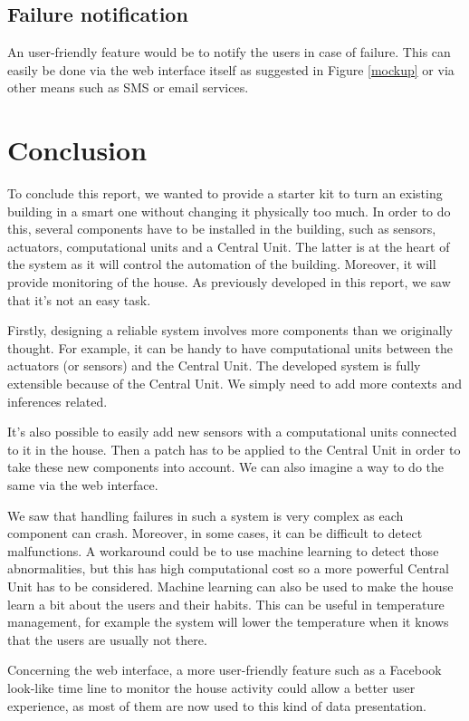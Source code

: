 \documentclass{acm_proc_article-sp}
\begin{document}
\subsection{Failure notification}
An user-friendly feature would be to notify the users in case of failure. This can easily be done via the web interface itself as suggested in Figure \ref{mockup} or via other means such as SMS or email services.

\section{Conclusion}
To conclude this report, we wanted to provide a starter kit to turn an existing building in a smart one without changing it physically too much. 
In order to do this, several components have to be installed in the building, such as sensors, actuators, computational units and a Central Unit. 
The latter is at the heart of the system as it will control the automation of the building. 
Moreover, it will provide monitoring of the house. 
As previously developed in this report, we saw that it's not an easy task.

Firstly, designing a reliable system involves more components than we originally thought. 
For example, it can be handy to have computational units between the actuators (or sensors) and the Central Unit. 
The developed system is fully extensible because of the Central Unit. We simply need to add more contexts and inferences related. 

It's also possible to easily add new sensors with a computational units connected to it in the house. 
Then a patch has to be applied to the Central Unit in order to take these new components into account. 
We can also imagine a way to do the same via the web interface. 

We saw that handling failures in such a system is very complex as each component can crash. 
Moreover, in some cases, it can be difficult to detect malfunctions. 
A workaround could be to use machine learning to detect those abnormalities, but this has high computational cost so a more powerful Central Unit has to be considered. 
Machine learning can also be used to make the house learn a bit about the users and their habits. 
This can be useful in temperature management, for example the system will lower the temperature when it knows that the users are usually not there. 

Concerning the web interface, a more user-friendly feature such as a Facebook look-like time line to monitor the house activity could allow a better user experience, as most of them are now used to this kind of data presentation. 



\nocite{*}

\end{document}
